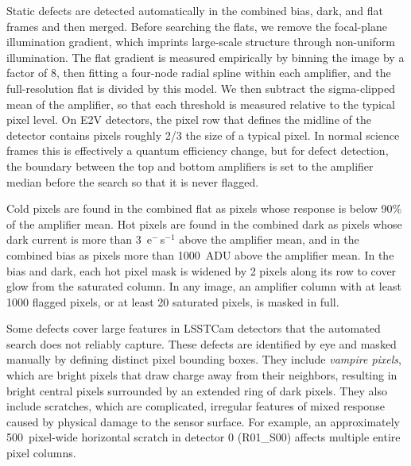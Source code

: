 

Static defects are detected automatically in the combined bias, dark, and flat frames and then merged.
Before searching the flats, we remove the focal-plane illumination gradient, which imprints large-scale structure through non-uniform illumination.
The flat gradient is measured empirically by binning the image by a factor of 8, then fitting a four-node radial spline within each amplifier, and the full-resolution flat is divided by this model.
We then subtract the sigma-clipped mean of the amplifier, so that each threshold is measured relative to the typical pixel level.
On E2V detectors, the pixel row that defines the midline of the detector contains pixels roughly 2/3 the size of a typical pixel.
In normal science frames this is effectively a quantum efficiency change, but for defect detection, the boundary between the top and bottom amplifiers is set to the amplifier median before the search so that it is never flagged.

Cold pixels are found in the combined flat as pixels whose response is below 90\% of the amplifier mean.
Hot pixels are found in the combined dark as pixels whose dark current is more than 3~e$^-$\,s$^{-1}$ above the amplifier mean, and in the combined bias as pixels more than 1000~ADU above the amplifier mean.
In the bias and dark, each hot pixel mask is widened by 2 pixels along its row to cover glow from the saturated column.
In any image, an amplifier column with at least 1000 flagged pixels, or at least 20 saturated pixels, is masked in full.

Some defects cover large features in LSSTCam detectors that the automated search does not reliably capture.
These defects are identified by eye and masked manually by defining distinct pixel bounding boxes.
They include \textit{vampire pixels}, which are bright pixels that draw charge away from their neighbors, resulting in bright central pixels surrounded by an extended ring of dark pixels.
They also include scratches, which are complicated, irregular features of mixed response caused by physical damage to the sensor surface.
For example, an approximately 500~pixel-wide horizontal scratch in detector 0 (R01\_S00) affects multiple entire pixel columns.

